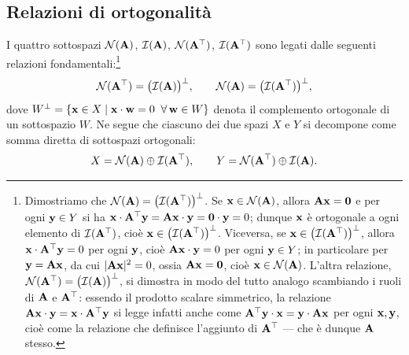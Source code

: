 \subsection{Relazioni di ortogonalit\`a}

I quattro sottospazi $\mathcal{N}(\mathbf{A})$, $\mathcal{I}(\mathbf{A})$, $\mathcal{N}(\mathbf{A}^\top)$, $\mathcal{I}(\mathbf{A}^\top)$ sono legati dalle seguenti relazioni fondamentali:\footnote{Dimostriamo che $\mathcal{N}(\mathbf{A}) = \bigl(\mathcal{I}(\mathbf{A}^\top)\bigr)^\perp$. 
	Se $\mathbf{x} \in \mathcal{N}(\mathbf{A})$, allora $\mathbf{A}\mathbf{x} = \mathbf{0}$ e per ogni 
	$\mathbf{y} \in Y$ si ha $\mathbf{x} \cdot \mathbf{A}^\top\mathbf{y} = \mathbf{A}\mathbf{x} \cdot \mathbf{y} = 
	\mathbf{0} \cdot \mathbf{y} = 0$; dunque $\mathbf{x}$ \`e ortogonale a ogni elemento 
	di $\mathcal{I}(\mathbf{A}^\top)$, cio\`e $\mathbf{x} \in \bigl(\mathcal{I}(\mathbf{A}^\top)\bigr)^\perp$. 
	Viceversa, se $\mathbf{x} \in \bigl(\mathcal{I}(\mathbf{A}^\top)\bigr)^\perp$, allora 
	$\mathbf{x} \cdot \mathbf{A}^\top\mathbf{y} = 0$ per ogni $\mathbf{y}$, cio\`e 
	$\mathbf{A}\mathbf{x} \cdot \mathbf{y} = 0$ per ogni $\mathbf{y} \in Y$; in particolare per $\mathbf{y}=\mathbf{A}\mathbf{x}$, da cui $|\mathbf{A}\mathbf{x}|^2=0$, ossia
	$\mathbf{A}\mathbf{x} = \mathbf{0}$, cio\`e $\mathbf{x} \in \mathcal{N}(\mathbf{A})$. 
	L'altra relazione, $\mathcal{N}(\mathbf{A}^\top) = \bigl(\mathcal{I}(\mathbf{A})\bigr)^\perp$, 
	si dimostra in modo del tutto analogo scambiando i ruoli di $\mathbf{A}$ 
	e $\mathbf{A}^\top$: essendo il prodotto scalare simmetrico, la relazione $\mathbf{A}\mathbf{x}\cdot\mathbf{y}=\mathbf{x}\cdot\mathbf{A}^\top\mathbf{y}$ si legge infatti anche come $\mathbf{A}^\top\mathbf{y}\cdot\mathbf{x}=\mathbf{y}\cdot\mathbf{A}\mathbf{x}$ per ogni $\mathbf{x},\mathbf{y}$, cio\`e come la relazione che definisce l'aggiunto di $\mathbf{A}^\top$ --- che \`e dunque $\mathbf{A}$ stesso.}
\begin{equation}\label{eq:ortogonalita}
	\mathcal{N}(\mathbf{A}^\top)=\bigl(\mathcal{I}(\mathbf{A})\bigr)^\perp, \qquad
	\mathcal{N}(\mathbf{A})=\bigl(\mathcal{I}(\mathbf{A}^\top)\bigr)^\perp,
\end{equation}
dove $W^\perp = \{\mathbf{x} \in X \mid \mathbf{x} \cdot \mathbf{w} = 0 \;\; \forall\, \mathbf{w} \in W\}$ denota il complemento ortogonale di un sottospazio $W$. Ne segue che ciascuno dei due spazi $X$ e $Y$ si decompone come somma diretta di sottospazi ortogonali:
\begin{equation}\label{eq:somma_diretta}
	X=\mathcal{N}(\mathbf{A}) \oplus \mathcal{I}(\mathbf{A}^\top), \qquad Y=\mathcal{N}(\mathbf{A}^\top) \oplus \mathcal{I}(\mathbf{A}).
\end{equation}




